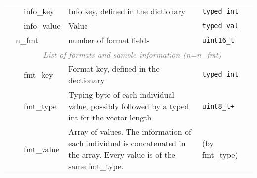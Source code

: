 \documentclass[10pt]{article}
\begin{document}
\begin{table}[ht]
{\begin{tabular}{|l|l|l|p{8.2cm}|l|r|}
  & & {\sf info\_key} & Info key, defined in the dictionary & {\tt typed int} & \\\cline{3-6}
  & & {\sf info\_value} & Value & {\tt typed val} &\\
  \cline{2-6}
  & \multicolumn{2}{l|}{\sf n\_fmt} & number of format fields & {\tt uint16\_t} & \\\cline{2-6}
  & \multicolumn{5}{c|}{\textcolor{gray}{\it List of formats and sample information (n=n\_fmt)}} \\\cline{3-6}
  & & {\sf fmt\_key} & Format key, defined in the dectionary & {\tt typed int} & \\\cline{3-6}
  & & {\sf fmt\_type} & Typing byte of each individual value, possibly followed by a typed int for the vector length & {\tt uint8\_t+} & \\\cline{3-6}
  & & {\sf fmt\_value} & Array of values. The information of each individual is concatenated in the array. Every value is of the same {\sf fmt\_type}. & (by {\sf fmt\_type}) &\\
  \cline{1-6}
\end{tabular}}
\end{table}
\end{document}
